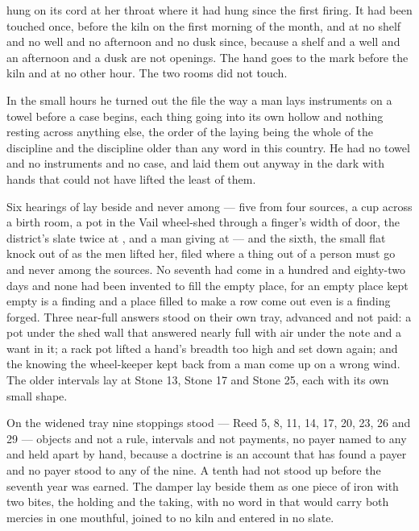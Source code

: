  hung on its cord at her throat where it had hung since the first firing. It had been touched once, before the kiln on the first morning of the month, and at no shelf and no well and no afternoon and no dusk since, because a shelf and a well and an afternoon and a dusk are not openings. The hand goes to the mark before the kiln and at no other hour. The two rooms did not touch.

\scenebreak

In the small hours he turned out the file the way a man lays instruments on a towel before a case begins, each thing going into its own hollow and nothing resting across anything else, the order of the laying being the whole of the discipline and the discipline older than any word in this country. He had no towel and no instruments and no case, and laid them out anyway in the dark with hands that could not have lifted the least of them.

Six hearings of  lay beside and never among --- five from four sources, a cup across a birth room, a pot in the Vail wheel-shed through a finger's width of door, the district's slate twice at , and a man giving at  --- and the sixth, the small flat knock out of  as the men lifted her, filed where a thing out of a person must go and never among the sources. No seventh had come in a hundred and eighty-two days and none had been invented to fill the empty place, for an empty place kept empty is a finding and a place filled to make a row come out even is a finding forged. Three near-full answers stood on their own tray, advanced and not paid: a pot under the shed wall that answered nearly full with air under the note and a want in it; a rack pot lifted a hand's breadth too high and set down again; and the knowing the wheel-keeper kept back from a man come up on a wrong wind. The older intervals lay at Stone 13, Stone 17 and Stone 25, each with its own small shape.

On the widened tray nine stoppings stood --- Reed 5, 8, 11, 14, 17, 20, 23, 26 and 29 --- objects and not a rule, intervals and not payments, no payer named to any and held apart by hand, because a doctrine is an account that has found a payer and no payer stood to any of the nine. A tenth had not stood up before the seventh year was earned. The damper lay beside them as one piece of iron with two bites, the holding and the taking, with no word in  that would carry both mercies in one mouthful, joined to no kiln and entered in no slate.

